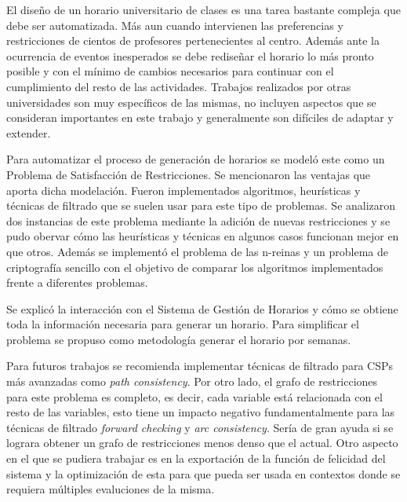 \begin{conclusions}

El diseño de un horario universitario de clases es una tarea bastante compleja que debe ser automatizada. M\'as aun cuando intervienen las preferencias y restricciones de cientos de profesores pertenecientes al centro. Adem\'as ante la ocurrencia de eventos inesperados se debe rediseñar el horario lo m\'as pronto posible y con el m\'inimo de cambios necesarios para continuar con el cumplimiento del resto de las actividades. Trabajos realizados por otras universidades son muy espec\'ificos de las mismas, no incluyen aspectos que se consideran importantes en este trabajo y generalmente son dif\'iciles de adaptar y extender.

Para automatizar el proceso de generaci\'on de horarios se model\'o este como un Problema de Satisfacci\'on de Restricciones. Se mencionaron las ventajas que aporta dicha modelaci\'on. Fueron implementados algoritmos, heur\'isticas y t\'ecnicas de filtrado que se suelen usar para este tipo de problemas. Se analizaron dos instancias de este problema mediante la adici\'on de nuevas restricciones y se pudo obervar c\'omo las heur\'isticas y t\'ecnicas en algunos casos funcionan mejor en que otros. Adem\'as se implement\'o el problema de las n-reinas y un problema de criptograf\'ia sencillo con el objetivo de comparar los algoritmos implementados frente a diferentes problemas.

Se explic\'o la interacci\'on con el Sistema de Gesti\'on de Horarios y c\'omo se obtiene toda la informaci\'on necesaria para generar un horario. Para simplificar el problema se propuso como metodolog\'ia generar el horario por semanas.

Para futuros trabajos se recomienda implementar t\'ecnicas de filtrado para CSPs m\'as avanzadas como \emph{path consistency}. Por otro lado, el grafo de restricciones para este problema es completo, es decir, cada variable est\'a relacionada con el resto de las variables, esto tiene un impacto negativo fundamentalmente para las t\'ecnicas de filtrado \emph{forward checking} y \emph{arc consistency}. Ser\'ia de gran ayuda si se lograra obtener un grafo de restricciones menos denso que el actual. Otro aspecto en el que se pudiera trabajar es en la exportaci\'on de la funci\'on de felicidad del sistema y la optimizaci\'on de esta para que pueda ser usada en contextos donde se requiera m\'ultiples evaluciones de la misma.

\end{conclusions}